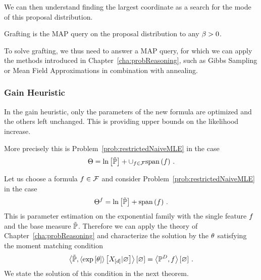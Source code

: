 We can then understand finding the largest coordinate as a search for the mode of this proposal distribution.
\begin{theorem}
	Grafting is the MAP query on the proposal distribution to any $\beta>0$.
\end{theorem}

To solve grafting, we thus need to answer a MAP query, for which we can apply the methods introduced in Chapter~\ref{cha:probReasoning}, such as Gibbs Sampling or Mean Field Approximations in combination with annealing.









\subsubsection{Gain Heuristic}

In the gain heuristic, only the parameters of the new formula are optimized and the others left unchanged.
This is providing upper bounds on the likelihood increase.

More precisely this is Problem~\ref{prob:restrictedNaiveMLE} in the case
\begin{align*}
	\Theta = \ln \left[ \tilde{\mathbb{P}} \right] + \cup_{f\in\mathcal{F}} \mathrm{span}\left(f\right) \, . 
\end{align*}


Let us choose a formula $f\in\mathcal{F}$ and consider Problem~\ref{prob:restrictedNaiveMLE}  in the case
\begin{align*}
	\Theta^{f} = \ln \left[ \tilde{\mathbb{P}} \right] + \mathrm{span}\left(f\right) \, . 
\end{align*}
This is parameter estimation on the exponential family with the single feature $f$ and the base measure $\tilde{\mathbb{P}}$.
Therefore we can apply the theory of Chapter~\ref{cha:probReasoning} and characterize the solution by the $\theta$ satisfying the moment matching condition
\begin{align*}
	\left\langle \tilde{\mathbb{P}}, \left\langle \mathrm{exp}\left[\theta\right]\right\rangle \left[ X_{[d]} | \varnothing \right] \right\rangle \left[ \varnothing \right] = \left\langle \mathbb{P}^{D}, f\right\rangle \left[ \varnothing \right] \, . 
\end{align*}
We state the solution of this condition in the next theorem.


